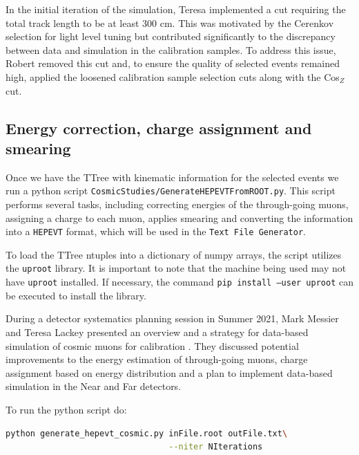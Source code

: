 \documentclass[12pt]{article}
\begin{document}
In the initial iteration of the simulation, Teresa implemented a cut requiring the total track length to be at least 300 cm. This was motivated by the Cerenkov selection for light level tuning but contributed significantly to the discrepancy between data and simulation in the calibration samples. To address this issue, Robert removed this cut and, to ensure the quality of selected events remained high, applied the loosened calibration sample selection cuts along with the Cos$_Z$ cut.

\FloatBarrier
\subsection{Energy correction, charge assignment and smearing}\label{secPython}
Once we have the TTree with kinematic information for the selected events we run a python script \texttt{CosmicStudies/GenerateHEPEVTFromROOT.py}. This script performs several tasks, including correcting energies of the through-going muons, assigning a charge to each muon, applies smearing and converting the information into a \texttt{HEPEVT} format, which will be used in the \texttt{Text File Generator}.

To load the TTree ntuples into a dictionary of numpy arrays, the script utilizes the \texttt{uproot} library. It is important to note that the machine being used may not have \texttt{uproot} installed. If necessary, the command \texttt{pip install --user uproot} can be executed to install the library.

During a detector systematics planning session in Summer 2021, Mark Messier and Teresa Lackey presented an overview and a strategy for data-based simulation of cosmic muons for calibration \cite{NOVA-doc-51327-v3}. They discussed potential improvements to the energy estimation of through-going muons, charge assignment based on energy distribution and a plan to implement data-based simulation in the Near and Far detectors.

To run the python script do:
\begin{lstlisting}[frame=single,language=bash]
python generate_hepevt_cosmic.py inFile.root outFile.txt\
                                 --niter NIterations
\end{lstlisting}
\end{document}
